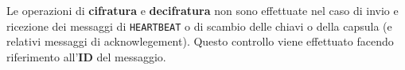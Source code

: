\documentclass[a4paper, 12pt, oneside]{article}
\theoremstyle{definition}
\begin{document}
Le operazioni di \textbf{cifratura} e \textbf{decifratura} non sono effettuate nel caso di invio e ricezione dei messaggi di \texttt{HEARTBEAT} o di scambio delle chiavi o della capsula (e relativi messaggi di acknowlegement). Questo controllo viene effettuato facendo riferimento all'\textbf{ID} del messaggio.

\newpage
\printbibliography[title={Riferimenti bibliografici e risorse consultate}, heading=bibintoc]
\end{document}
